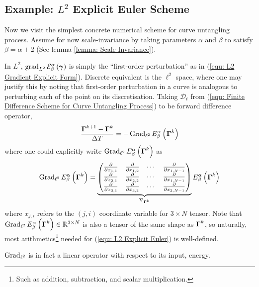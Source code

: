 \documentclass[../dissertation.tex]{subfiles}
\begin{document}
\subsection{Example: $L^2$ Explicit Euler Scheme}
Now we visit the simplest concrete numerical scheme for curve untangling process.
Assume for now scale-invariance by taking parameters $\alpha$ and $\beta$ to satisfy $\beta = \alpha+2$ (See lemma \ref{lemma: Scale-Invariance}).

In $L^2$, $\operatorname{grad}_{L^2} \mathcal{E}_{\beta}^{\alpha} \left( \boldsymbol{\gamma} \right)$ is simply the ``first-order perturbation'' as in (\ref{equ: L2 Gradient Explicit Form}).
Discrete equivalent is the $\ell^2$ space,
where one may justify this by noting that first-order perturbation in a curve is analogous to perturbing each of the point on its discretisation.
Taking $\mathcal{D}_t$ from (\ref{equ: Finite Difference Scheme for Curve Untangling Process}) to be forward difference operator,
\begin{equation}
    \frac{\boldsymbol{\Gamma}^{k+1} - \boldsymbol{\Gamma}^k}{\Delta T} = - \operatorname{Grad}_{\ell^2} E_{\beta}^{\alpha} \left( \boldsymbol{\Gamma}^k \right)
    \label{equ: L2 Explicit Euler}
\end{equation}
where one could explicitly write $\operatorname{Grad}_{\ell^2} E_{\beta}^\alpha \left( \boldsymbol{\Gamma}^k \right)$ as
\begin{equation}
    \operatorname{Grad}_{\ell^2} E_{\beta}^\alpha \left( \boldsymbol{\Gamma}^k \right)
    =
    \underbrace{
        \begin{pmatrix}
            \frac{\partial}{\partial x_{1,1}} & \frac{\partial}{\partial x_{1,2}} & \cdots & \frac{\partial}{\partial x_{1,N-1}} \\
            \frac{\partial}{\partial x_{2,1}} & \frac{\partial}{\partial x_{2,2}} & \cdots & \frac{\partial}{\partial x_{1,N-1}} \\
            \frac{\partial}{\partial x_{3,1}} & \frac{\partial}{\partial x_{3,2}} & \cdots & \frac{\partial}{\partial x_{3,N-1}}
        \end{pmatrix}
    }_{\nabla_{\boldsymbol{\Gamma}^k}}
    E_{\beta}^{\alpha} \left( \boldsymbol{\Gamma}^k \right)
    \label{equ: Gradient in l2}
\end{equation}
where $x_{j,i}$ refers to the $\left( j,i \right)$ coordinate variable for $3 \times N$ tensor.
Note that $\operatorname{Grad}_{\ell^2} E_{\beta}^\alpha \left( \boldsymbol{\Gamma}^k \right) \in \mathbb{R}^{3 \times N}$ is also a tensor of the same shape as $\boldsymbol{\Gamma}^k$,
so naturally, most arithmetics\footnote{Such as addition, subtraction, and scalar multiplication.} needed for (\ref{equ: L2 Explicit Euler}) is well-defined.
\begin{remark}
    $\operatorname{Grad}_{\ell^2}$ is in fact a linear operator with respect to its input, energy.
\end{remark}
\end{document}

